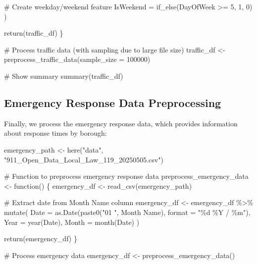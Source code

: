 \documentclass[
  letterpaper,
  DIV=11,
  numbers=noendperiod]{scrreprt}
\newenvironment{Shaded}{\begin{snugshade}}{\end{snugshade}}
\newcommand{\AttributeTok}[1]{\textcolor[rgb]{0.40,0.45,0.13}{#1}}
\newcommand{\CommentTok}[1]{\textcolor[rgb]{0.37,0.37,0.37}{#1}}
\newcommand{\ControlFlowTok}[1]{\textcolor[rgb]{0.00,0.23,0.31}{#1}}
\newcommand{\DecValTok}[1]{\textcolor[rgb]{0.68,0.00,0.00}{#1}}
\newcommand{\FunctionTok}[1]{\textcolor[rgb]{0.28,0.35,0.67}{#1}}
\newcommand{\NormalTok}[1]{\textcolor[rgb]{0.00,0.23,0.31}{#1}}
\newcommand{\OtherTok}[1]{\textcolor[rgb]{0.00,0.23,0.31}{#1}}
\newcommand{\SpecialCharTok}[1]{\textcolor[rgb]{0.37,0.37,0.37}{#1}}
\newcommand{\StringTok}[1]{\textcolor[rgb]{0.13,0.47,0.30}{#1}}
\begin{document}
\begin{Shaded}
\begin{Highlighting}[]
      \CommentTok{\# Create weekday/weekend feature}
      \AttributeTok{IsWeekend =} \FunctionTok{if\_else}\NormalTok{(DayOfWeek }\SpecialCharTok{\textgreater{}=} \DecValTok{5}\NormalTok{, }\DecValTok{1}\NormalTok{, }\DecValTok{0}\NormalTok{)}
\NormalTok{    )}
  
  \FunctionTok{return}\NormalTok{(traffic\_df)}
\NormalTok{\}}

\CommentTok{\# Process traffic data (with sampling due to large file size)}
\NormalTok{traffic\_df }\OtherTok{\textless{}{-}} \FunctionTok{preprocess\_traffic\_data}\NormalTok{(}\AttributeTok{sample\_size =} \DecValTok{100000}\NormalTok{)}

\CommentTok{\# Show summary}
\FunctionTok{summary}\NormalTok{(traffic\_df)}
\end{Highlighting}
\end{Shaded}

\subsection{Emergency Response Data
Preprocessing}\label{emergency-response-data-preprocessing}

Finally, we process the emergency response data, which provides
information about response times by borough:

\begin{Shaded}
\begin{Highlighting}[]
\NormalTok{emergency\_path }\OtherTok{\textless{}{-}} \FunctionTok{here}\NormalTok{(}\StringTok{"data"}\NormalTok{, }\StringTok{"911\_Open\_Data\_Local\_Law\_119\_20250505.csv"}\NormalTok{)}

\CommentTok{\# Function to preprocess emergency response data}
\NormalTok{preprocess\_emergency\_data }\OtherTok{\textless{}{-}} \ControlFlowTok{function}\NormalTok{() \{}
\NormalTok{  emergency\_df }\OtherTok{\textless{}{-}} \FunctionTok{read\_csv}\NormalTok{(emergency\_path)}
  
  \CommentTok{\# Extract date from \textquotesingle{}Month Name\textquotesingle{} column}
\NormalTok{  emergency\_df }\OtherTok{\textless{}{-}}\NormalTok{ emergency\_df }\SpecialCharTok{\%\textgreater{}\%}
    \FunctionTok{mutate}\NormalTok{(}
      \AttributeTok{Date =} \FunctionTok{as.Date}\NormalTok{(}\FunctionTok{paste0}\NormalTok{(}\StringTok{"01 "}\NormalTok{, }\StringTok{\textasciigrave{}}\AttributeTok{Month Name}\StringTok{\textasciigrave{}}\NormalTok{), }\AttributeTok{format =} \StringTok{"\%d \%Y / \%m"}\NormalTok{),}
      \AttributeTok{Year =} \FunctionTok{year}\NormalTok{(Date),}
      \AttributeTok{Month =} \FunctionTok{month}\NormalTok{(Date)}
\NormalTok{    )}
  
  \FunctionTok{return}\NormalTok{(emergency\_df)}
\NormalTok{\}}

\CommentTok{\# Process emergency data}
\NormalTok{emergency\_df }\OtherTok{\textless{}{-}} \FunctionTok{preprocess\_emergency\_data}\NormalTok{()}
\end{Highlighting}
\end{Shaded}
\end{document}
